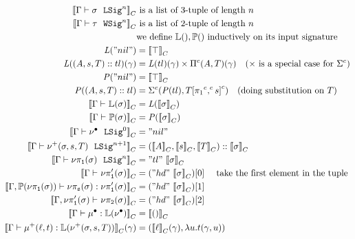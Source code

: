 \begin{align*}
  \denotesC{\goodSig{\Gm}{\lsig}{n}} & \text{ is a list of 3-tuple of length $n$  } \\
  \denotesC{\goodWSig{\Gm}{\wsig}{n}} &\text{ is a list of 2-tuple of length $n$ } \\
  & \text{we define }\TyLkg{}, \TyTkg{} \text{ inductively on its input signature} \\ 
  \mathit{L}("nil") &= \denotesC{\top} \\
  \mathit{L}((A,s,T) :: tl)(\gm) &= {\mathit{L}(tl)}(\gm) \times \GluedPi{A}{T}(\gm) \quad \text{($\times$ is a special case for $\Glued{\Sigma}$)}  \\
  \mathit{P}("nil") &= \denotesC{\top}\\
  \mathit{P}((A,s,T) :: tl) &= \Glued{\Sigma}(\mathit{P}(tl), \Gsub{T}{\GSubstExt{\Glued{\pi_1}}{s}}) \quad \text{(doing substitution on $T$)} \\
  \denotesC{\goodType{\Gm}{\TyLkg{\lsig}}{}} &= \mathit{L}(\denotesC{\lsig}) \\
  \denotesC{\goodType{\Gm}{\TyTkg{\lsig}}{}} &= \mathit{P}(\denotesC{\lsig}) \\
  \denotesC{\goodSig{\Gm}{\LSigEmp}{0}} &= "nil"\\ 
  \denotesC{\goodSig{\Gm}{\LSigAdd{\lsig}{s}{T}}{n+1}} &= (\denotesC{A}, \denotesC{s}, \denotesC{T})::\denotesC{\lsig}\\ 
  \denotesC{\goodSig{\Gm}{\lsigproj{1}{\lsig}}{n}} &= "tl"~\denotesC{\lsig}\\ 
  \denotesC{\goodType{\Gm}{\lsigprojT{\lsig}}{}} &= ("hd"~\denotesC{\lsig})[0] \quad \text{ take the first element in the tuple}\\ 
  \denotesC{\goodTerm{\Gm, \TyTkg{\lsigproj{1}{\lsig}}}{\lsigproj{s}{\lsig}}{\lsigprojT{\lsig}}} &= ("hd"~\denotesC{\lsig})[1]\\ 
  \denotesC{\goodType{\Gm, \lsigprojT{\lsig}}{\lsigproj{2}{\lsig}}{}} &= ("hd"~\denotesC{\lsig})[2]\\
  \denotesC{\goodTerm{\Gm}{\LkgEmp}{\TyLkg{\LSigEmp}}} &= \denotesC{\unit} \\
  \denotesC{\goodTerm{\Gm}{\LkgAdd{\lkg}{t}}{\TyLkg{\LSigAdd{\lsig}{s}{T}}}}(\gm) &= (\denotesC{\lkg}(\gm), \lambda u . t (\gm, u)) \\

\end{align*}
